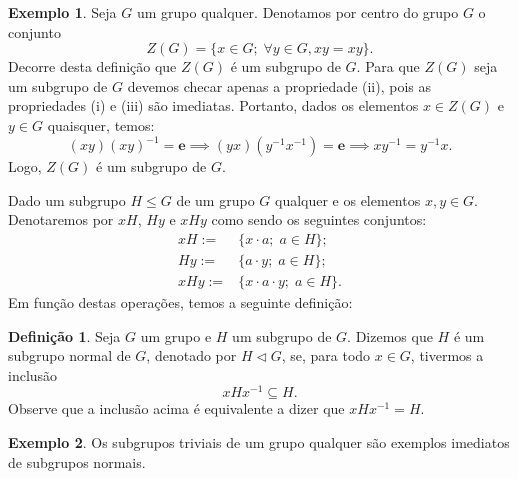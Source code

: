 \documentclass[twoside,openright,titlepage,numbers=noenddot,headinclude,  lineheaders footinclude=true,cleardoublepage=empty,
                                BCOR=5mm,paper=a4,fontsize=12pt ]{scrbook}
\theoremstyle{definition}
\newtheorem{definicao}{Definição}[chapter]
\newtheorem{exmp}{Exemplo}[section]
\begin{document}
\begin{exmp}
Seja $G$ um grupo qualquer. Denotamos por centro do grupo $G$ o conjunto
\[
Z(G) = \{ x \in G; \; \forall y \in G, xy = xy \}.
\]
Decorre desta definição que $Z(G)$ é um subgrupo de $G$. Para que $Z(G)$ seja um subgrupo de $G$
devemos checar apenas a propriedade (ii), pois as propriedades (i) e (iii) são
imediatas. Portanto, dados os elementos $x \in Z(G)$ e $y \in G$ quaisquer, temos:
\[
(xy)(xy)^{-1} = \bm{e} \implies (yx)(y^{-1}x^{-1}) = \bm{e} \implies xy^{-1} = y^{-1}x.
\]
Logo, $Z(G)$ é um subgrupo de $G$.
\end{exmp}

Dado um subgrupo $H \leq G$ de um grupo $G$ qualquer e os elementos $x, y \in G$. Denotaremos
por $xH$, $Hy$ e $xHy$ como sendo os seguintes conjuntos:
\begin{align*}
xH := & \{ x \cdot a; \; a \in H\}; \\
Hy := & \{ a \cdot y; \; a \in H\}; \\
xHy := & \{ x \cdot a \cdot y; \; a \in H\}.
\end{align*}
Em função destas operações, temos a seguinte definição:
\begin{definicao}
Seja $G$ um grupo e $H$ um subgrupo de $G$. Dizemos que $H$ é um subgrupo normal de $G$, denotado
por $H \triangleleft G$, se, para todo $x \in G$, tivermos a inclusão
\[ xHx^{-1} \subseteq H. \]
Observe que a inclusão acima é equivalente a dizer que $ xHx^{-1} = H. $
\end{definicao}

\begin{exmp}
Os subgrupos triviais de um grupo qualquer são exemplos imediatos de subgrupos normais.
\end{exmp}
\end{document}
